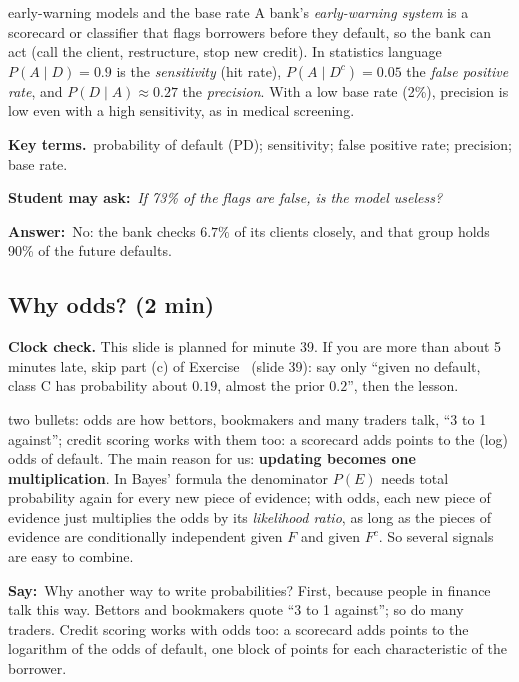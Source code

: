 \documentclass[11pt,a4paper,parskip=half]{scrartcl}
\newcommand{\terms}{\par\textbf{\color{plum}Key terms.}\ }
\newcommand{\sq}[1]{\par\textbf{\color{plum}Student may ask:}\ \emph{#1}\par}
\newcommand{\ans}{\textbf{Answer:}\ }
\newcommand{\say}{\textbf{\color{teal}Say:}\ }
\begin{document}
\begin{bg}{early-warning models and the base rate}
	A bank's \emph{early-warning system} is a scorecard or classifier that
	flags borrowers before they default, so the bank can act (call the
	client, restructure, stop new credit). In statistics language
	$P(A\mid D)=0.9$ is the \emph{sensitivity} (hit rate), $P(A\mid D^c)=0.05$
	the \emph{false positive rate}, and $P(D\mid A)\approx0.27$ the
	\emph{precision}. With a low base rate (2\%), precision is low even with
	a high sensitivity, as in medical screening.

	\terms probability of default (PD); sensitivity; false positive rate;
	precision; base rate.

	\sq{If 73\% of the flags are false, is the model useless?}
	\ans No: the bank checks $6.7\%$ of its clients closely, and that group
	holds 90\% of the future defaults.
\end{bg}

\subsection{Why odds? (2 min)}

\begin{clockcheck}
	\textbf{Clock check.} This slide is planned for minute 39. If you are
	more than about 5 minutes late, skip part (c) of
	Exercise~ (slide 39): say only ``given no
	default, class C has probability about $0.19$, almost the prior
	$0.2$'', then the lesson.
\end{clockcheck}

\begin{onslide}
	two bullets: odds are how bettors, bookmakers and many traders talk,
	``3 to 1 against''; credit scoring works with them too: a scorecard
	adds points to the (log) odds of default. The main reason for us:
	\textbf{updating becomes one multiplication}. In Bayes' formula the
	denominator $P(E)$ needs total probability again for every new piece
	of evidence; with odds, each new piece of evidence just multiplies the
	odds by its \emph{likelihood ratio}, as long as the pieces of evidence
	are conditionally independent given $F$ and given $F^c$. So several
	signals are easy to combine.
\end{onslide}

\say Why another way to write probabilities? First, because people in
finance talk this way. Bettors and bookmakers quote ``3 to 1 against'';
so do many traders. Credit scoring works with odds too: a scorecard adds
points to the logarithm of the odds of default, one block of points for
each characteristic of the borrower.
\end{document}
